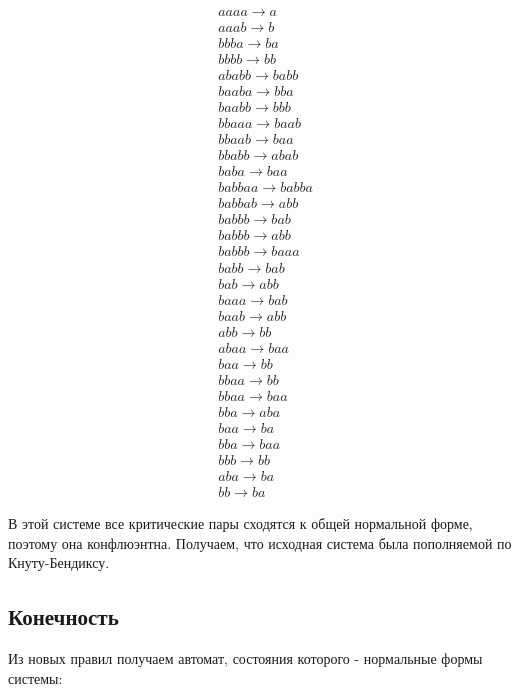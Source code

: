 \documentclass{article}
\begin{document}
\begin{align*}
&aaaa \rightarrow a \\
&aaab \rightarrow b \\
&bbba \rightarrow ba \\
&bbbb \rightarrow bb \\
&ababb \rightarrow babb \\
&baaba \rightarrow bba \\
&baabb \rightarrow bbb \\
&bbaaa \rightarrow baab \\
&bbaab \rightarrow baa \\
&bbabb \rightarrow abab \\
&baba \rightarrow baa \\
&babbaa \rightarrow babba \\
&babbab \rightarrow abb \\
&babbb \rightarrow bab \\
&babbb \rightarrow abb \\
&babbb \rightarrow baaa \\
&babb \rightarrow bab \\
&bab \rightarrow abb \\
&baaa \rightarrow bab \\
&baab \rightarrow abb \\
&abb \rightarrow bb \\
&abaa \rightarrow baa \\
&baa \rightarrow bb \\
&bbaa \rightarrow bb \\
&bbaa \rightarrow baa \\
&bba \rightarrow aba \\
&baa \rightarrow ba \\
&bba \rightarrow baa \\
&bbb \rightarrow bb \\
&aba \rightarrow ba \\
&bb \rightarrow ba
\end{align*}

В этой системе все критические пары сходятся к общей нормальной форме, поэтому она конфлюэнтна. Получаем, что исходная система была пополняемой по Кнуту-Бендиксу.

\subsection*{Конечность}

Из новых правил получаем автомат, состояния которого - нормальные формы системы:
\end{document}
